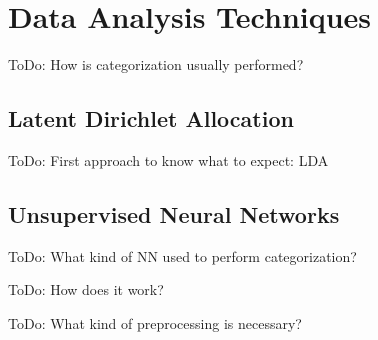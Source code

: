 \section{Data Analysis Techniques} %
\label{sec:data_anal_tech}

\colorbox{yellow!30}{ToDo:} How is categorization usually performed?

\subsection{Latent Dirichlet Allocation} %
\label{sub:lda}

\colorbox{yellow!30}{ToDo:} First approach to know what to expect: LDA

\subsection{Unsupervised Neural Networks} %
\label{sub:unsup_nn}
\colorbox{yellow!30}{ToDo:} What kind of NN used to perform categorization?

\colorbox{yellow!30}{ToDo:} How does it work?

\colorbox{yellow!30}{ToDo:} What kind of preprocessing is necessary?

